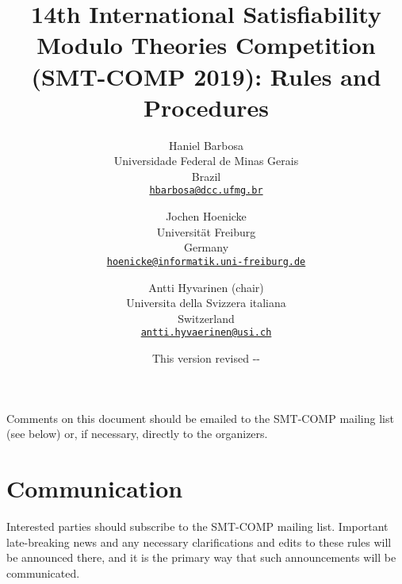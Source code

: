 \documentclass[12pt]{article}
\begin{document}
\date{\small This version revised \the\year-\the\month-\the\day}

\title{14th International Satisfiability Modulo Theories Competition
  (SMT-COMP 2019): Rules and Procedures}

\def\doauthor#1{{%
  \hsize.5\hsize \advance\hsize by-1cm %
  \def\\{\hss\egroup\hbox to\hsize\bgroup\strut\hss}%
  \vbox{\hbox to\hsize\bgroup\strut\hss#1\hss\egroup}}}%

\def\header#1{\medskip\noindent\textbf{#1}}

\author{%
Haniel Barbosa\\
Universidade Federal de Minas Gerais\\
Brazil\\
{\small\href{mailto:hbarbosa@dcc.ufmg.br}{\texttt{hbarbosa@dcc.ufmg.br}}}\\
\and
Jochen Hoenicke\\
Universit\"at Freiburg\\
Germany\\
{\small\href{mailto:hoenicke@informatik.uni-freiburg.de}{\texttt{hoenicke@informatik.uni-freiburg.de}}}\\
\and
Antti Hyvarinen (chair)\\
Universita della Svizzera italiana \\
Switzerland \\
{\small\href{mailto:antti.hyvaerinen@usi.ch}{\texttt{antti.hyvaerinen@usi.ch}}} \\
}

\maketitle

\noindent Comments on this document should be emailed to the SMT-COMP
mailing list (see below) or, if necessary, directly to the organizers.


\section{Communication}

Interested parties should subscribe to the SMT-COMP mailing list.
Important late-breaking news and any necessary clarifications and
edits to these rules will be announced there, and it is the primary
way that such announcements will be communicated.
\end{document}
